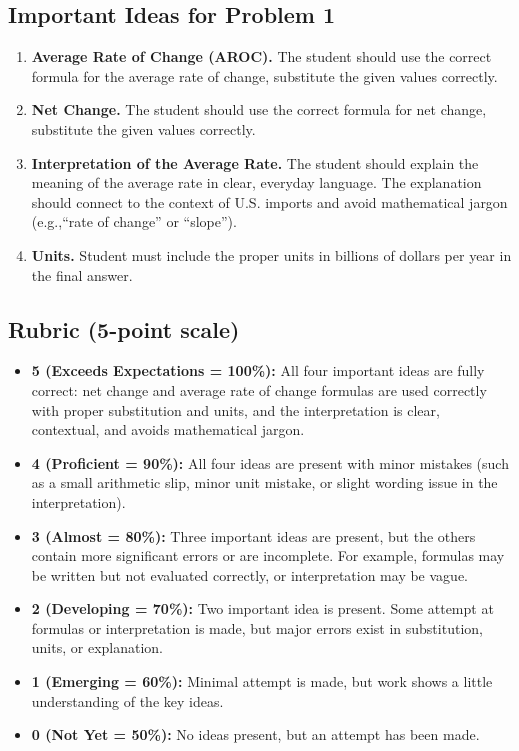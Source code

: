 \documentclass[11pt]{article}
\begin{document}
\pagestyle{fancy}
\subsection*{Important Ideas for Problem 1}

\begin{enumerate}
    \item \textbf{Average Rate of Change (AROC).}  
    The student should use the correct formula for the average rate of change, substitute the given values correctly.

    \item \textbf{Net Change.}  
    The student should use the correct formula for net change, substitute the given values correctly.

    \item \textbf{Interpretation of the Average Rate.}  
    The student should explain the meaning of the average rate in clear, everyday language. The explanation should connect to the context of U.S. imports and avoid mathematical jargon (e.g.,“rate of change” or “slope”).
    \item \textbf{Units.} Student must include the proper units in billions of dollars per year in the final answer.
\end{enumerate}

\subsection*{Rubric (5-point scale)}

\begin{itemize}
    \item \textbf{5 (Exceeds Expectations = 100\%):} 
    All four important ideas are fully correct: 
    net change and average rate of change formulas are used correctly with proper substitution and units, 
    and the interpretation is clear, contextual, and avoids mathematical jargon.

    \item \textbf{4 (Proficient = 90\%):} 
    All four ideas are present with minor mistakes (such as a small arithmetic slip, minor unit mistake, or slight wording issue in the interpretation).

    \item \textbf{3 (Almost = 80\%):} 
    Three important ideas are present, but the others contain more significant errors or are incomplete. 
    For example, formulas may be written but not evaluated correctly, or interpretation may be vague.

    \item \textbf{2 (Developing = 70\%):} 
    Two important idea is present. Some attempt at formulas or interpretation is made, but major errors exist in substitution, units, or explanation.

    \item \textbf{1 (Emerging = 60\%):} 
    Minimal attempt is made, but work shows a little understanding of the key ideas.

    \item \textbf{0 (Not Yet = 50\%):} 
    No ideas present, but an attempt has been made.
\end{itemize}
\vspace{2in}
\newpage
\end{document}
